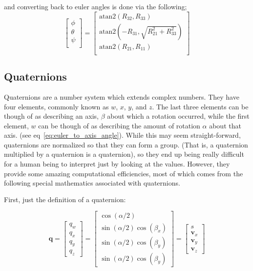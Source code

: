 \documentclass[paper=a4, fontsize=11pt]{scrartcl} %
\numberwithin{equation}{section} %
\numberwithin{figure}{section} %
\numberwithin{table}{section} %
\begin{document}
and converting back to euler angles is done via the following;
\begin{equation}
  \begin{bmatrix}
    \phi \\
    \theta \\
    \psi \\
  \end{bmatrix} =
	\begin{bmatrix}
	 \textrm{atan2}\left(R_{32}, R_{33}\right) \\
   \textrm{atan2}\left(-R_{31}, \sqrt{R_{21}^2 + R_{33}^2}\right) \\
   \textrm{atan2}\left(R_{21}, R_{11}\right) \\
  \end{bmatrix}
\end{equation}

\subsection{Quaternions}

Quaternions are a number system which extends complex numbers.  They have four elements, commonly known as $w$, $x$, $y$, and $z$.  The last three elements can be though of as describing an axis, $\beta$ about which a rotation occurred, while the first element, $w$ can be though of as describing the amount of rotation $\alpha$ about that axis. (see eq~\ref{eq:euler_to_axis_angle}). While this may seem straight-forward, quaternions are normalized so that they can form a group.  (That is, a quaternion multiplied by a quaternion is a quaternion), so they end up being really difficult for a human being to interpret just by looking at the values.  However, they provide some amazing computational efficiencies, most of which comes from the following special mathematics associated with quaternions.  

First, just the definition of a quaternion:

\begin{equation}
	\bm{q} = \begin{bmatrix}
				q_w \\
				q_x \\
				q_y \\
				q_z 
			 \end{bmatrix} 
		   = \begin{bmatrix}
				\cos(\alpha/2) \\
				\sin(\alpha/2)\cos(\beta_x) \\
				\sin(\alpha/2)\cos(\beta_y) \\
				\sin(\alpha/2)\cos(\beta_y) 
			 \end{bmatrix}
			 = \begin{bmatrix}
			   s \\
			   \bm{v}_x \\ 
			   \bm{v}_y \\
			   \bm{v}_z
			 \end{bmatrix}
	\label{eq:euler_to_axis_angle}
\end{equation}
\end{document}
